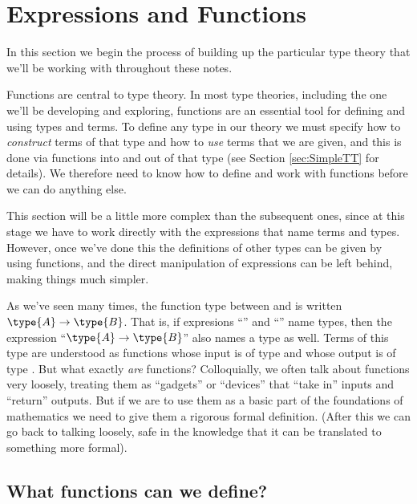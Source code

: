 \newpage





\section{Expressions and Functions}
\label{sec:Functions}

In this section we begin the process of building up the particular type theory that we'll be working with throughout these notes.  

Functions are central to type theory.  In most type theories, including the one we'll be developing and exploring, functions are an essential tool for defining and using types and terms.  To define any type in our theory we must specify how to \emph{construct} terms of that type and how to \emph{use} terms that we are given, and this is done via functions into and out of that type (see Section \ref{sec:SimpleTT} for details).
We therefore need to know how to define and work with functions before we can do anything else.  

This section will be a little more complex than the subsequent ones, since at this stage we have to work directly with the expressions that name terms and types.
However, once we've done this the definitions of other types can be given by using functions, and the direct manipulation of expressions can be left behind, making things much simpler.

As we've seen many times, the function type between  and  is written 
$\type{A} \to \type{B}$.  That is, if expresions ``'' and ``'' 
name types, then the expression ``$\type{A} \to \type{B}$'' also names a type as well.
Terms of this type are understood as functions whose input is of type  and whose output is of type .  
But what exactly \emph{are} functions?  Colloquially, we often 
talk about functions very loosely, treating them as ``gadgets'' or ``devices'' that ``take in'' inputs and ``return'' outputs.  But if we are to use them as a basic part of the foundations of mathematics we need to give them a rigorous formal definition.  (After this we can go back to talking loosely, safe in the knowledge that it can be translated to something more formal).

\subsection{What functions can we define?}

